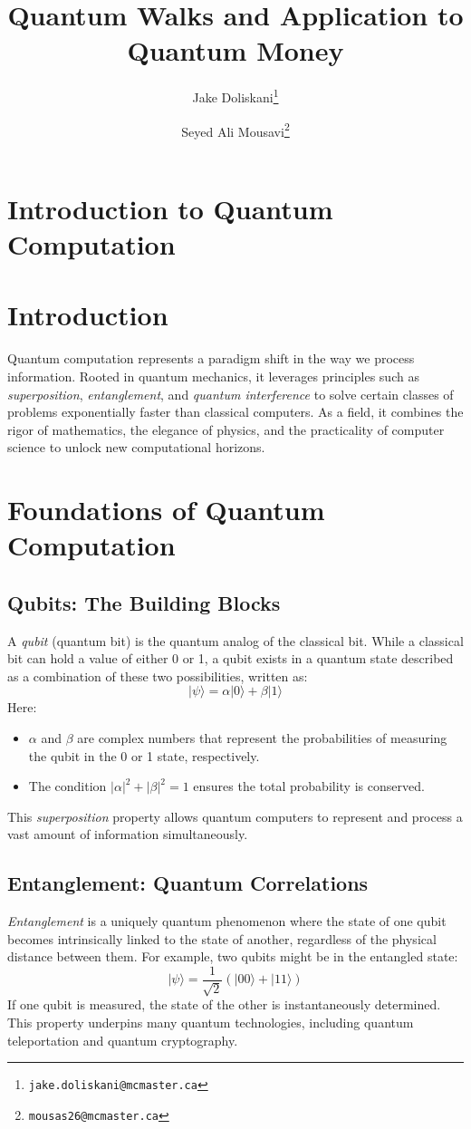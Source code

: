 \documentclass[11pt]{article}
\title{Quantum Walks and Application to Quantum Money}
\author{Jake Doliskani\thanks{\tt jake.doliskani@mcmaster.ca} }
\author{Seyed Ali Mousavi\thanks{\tt mousas26@mcmaster.ca} }
\affil{Department of Computing and Software, McMaster University}
\date{}
\theoremstyle{definition}
\begin{document}
\maketitle



\newpage
\section{Introduction to Quantum Computation}
\label{sec:intro}


\section*{Introduction}
Quantum computation represents a paradigm shift in the way we process information. Rooted in quantum mechanics, it leverages principles such as \textit{superposition}, \textit{entanglement}, and \textit{quantum interference} to solve certain classes of problems exponentially faster than classical computers. As a field, it combines the rigor of mathematics, the elegance of physics, and the practicality of computer science to unlock new computational horizons.

\section*{Foundations of Quantum Computation}

\subsection*{Qubits: The Building Blocks}
A \textit{qubit} (quantum bit) is the quantum analog of the classical bit. While a classical bit can hold a value of either 0 or 1, a qubit exists in a quantum state described as a combination of these two possibilities, written as:
\[
|\psi\rangle = \alpha|0\rangle + \beta|1\rangle
\]
Here:
\begin{itemize}
    \item $\alpha$ and $\beta$ are complex numbers that represent the probabilities of measuring the qubit in the 0 or 1 state, respectively.
    \item The condition $|\alpha|^2 + |\beta|^2 = 1$ ensures the total probability is conserved.
\end{itemize}
This \textit{superposition} property allows quantum computers to represent and process a vast amount of information simultaneously.

\subsection*{Entanglement: Quantum Correlations}
\textit{Entanglement} is a uniquely quantum phenomenon where the state of one qubit becomes intrinsically linked to the state of another, regardless of the physical distance between them. For example, two qubits might be in the entangled state:
\[
|\psi\rangle = \frac{1}{\sqrt{2}}(|00\rangle + |11\rangle)
\]
If one qubit is measured, the state of the other is instantaneously determined. This property underpins many quantum technologies, including quantum teleportation and quantum cryptography.
\end{document}
